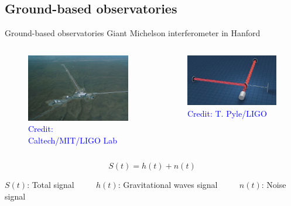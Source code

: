 \documentclass[pdf]{beamer}
\newcommand{\credit}[1]{\tiny{\textcolor{blue}{Credit: #1}}}
\begin{document}
\subsection{Ground-based observatories}
\begin{frame}{Ground-based observatories}
Giant Michelson interferometer in Hanford
\begin{columns}
\hspace{.5cm}	
\begin{figure}
\includegraphics[width=\textwidth]{fig/HiResHanford_5.jpg}
\caption*{\credit{Caltech/MIT/LIGO Lab}}
\end{figure}
\begin{figure}
\includegraphics[width=\textwidth]{fig/IFO_SCHEME.png}
\caption*{\credit{T. Pyle/LIGO}}
\end{figure}
\end{columns}
\begin{equation*}
S(t) = h(t) + n(t)
\end{equation*}
\begin{center}
 \begin{tiny}
	$S(t)$: Total signal $\qquad$ $h(t)$: Gravitational waves signal $\qquad$ $n(t)$: Noise signal
	\end{tiny}
\end{center}
\end{frame}
\end{document}
